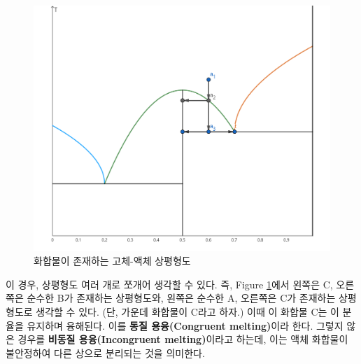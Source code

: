         \begin{figure}[H]
            \centering
            \includegraphics[scale=11]{Images/reactsys}
            \caption{화합물이 존재하는 고체-액체 상평형도}\label{f14}
        \end{figure}
        이 경우, 상평형도 여러 개로 쪼개어 생각할 수 있다. 즉, Figure \ref{f14}에서 왼쪽은 C, 오른쪽은 순수한 B가 존재하는 상평형도와, 왼쪽은 순수한 A, 오른쪽은 
        C가 존재하는 상평형도로 생각할 수 있다. (단, 가운데 화합물이 C라고 하자.) 이때 이 화합물 C는 이 분율을 유지하며 융해된다. 이를 \textbf{동질 용융(Congruent melting)}이라 
        한다. 그렇지 않은 경우를 \textbf{비동질 용융(Incongruent melting)}이라고 하는데, 이는 액체 화합물이 불안정하여 다른 상으로 분리되는 것을 의미한다.
